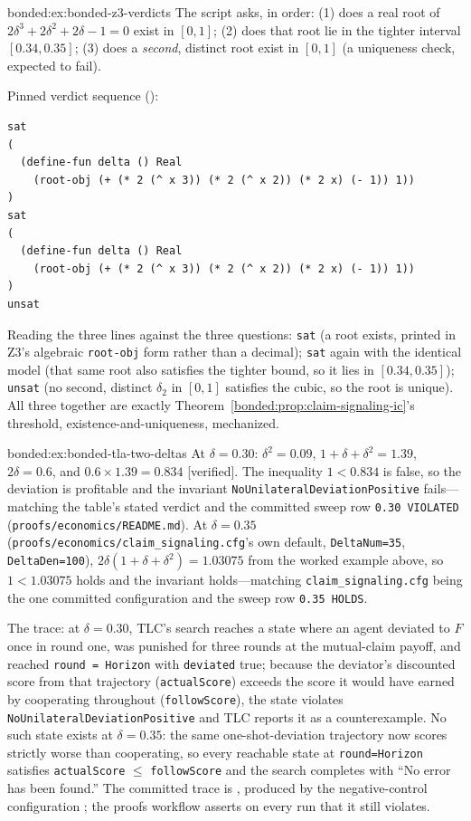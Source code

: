 \begin{pdSolution}{bonded:ex:bonded-z3-verdicts}
The script asks, in order: (1) does a real root of $2\delta^3+2\delta^2+2\delta-1=0$ exist in $[0,1]$; (2) does that root lie in the tighter interval $[0.34, 0.35]$; (3) does a \emph{second}, distinct root exist in $[0,1]$ (a uniqueness check, expected to fail).

Pinned verdict sequence ():
\begin{lstlisting}
sat
(
  (define-fun delta () Real
    (root-obj (+ (* 2 (^ x 3)) (* 2 (^ x 2)) (* 2 x) (- 1)) 1))
)
sat
(
  (define-fun delta () Real
    (root-obj (+ (* 2 (^ x 3)) (* 2 (^ x 2)) (* 2 x) (- 1)) 1))
)
unsat
\end{lstlisting}
Reading the three lines against the three questions: \texttt{sat} (a root exists, printed in Z3's algebraic \texttt{root-obj} form rather than a decimal); \texttt{sat} again with the identical model (that same root also satisfies the tighter bound, so it lies in $[0.34,0.35]$); \texttt{unsat} (no second, distinct $\delta_2$ in $[0,1]$ satisfies the cubic, so the root is unique). All three together are exactly Theorem~\ref{bonded:prop:claim-signaling-ic}'s threshold, existence-and-uniqueness, mechanized.
\end{pdSolution}
\begin{pdSolution}{bonded:ex:bonded-tla-two-deltas}
At $\delta=0.30$: $\delta^2=0.09$, $1+\delta+\delta^2=1.39$, $2\delta=0.6$, and $0.6\times1.39=0.834$ [verified]. The inequality $1<0.834$ is false, so the deviation is profitable and the invariant \texttt{NoUnilateralDeviationPositive} fails---matching the table's stated verdict and the committed sweep row \texttt{0.30 VIOLATED} (\texttt{proofs/economics/README.md}). At $\delta=0.35$ (\texttt{proofs/economics/claim\_signaling.cfg}'s own default, \texttt{DeltaNum=35}, \texttt{DeltaDen=100}), $2\delta(1+\delta+\delta^2)=1.03075$ from the worked example above, so $1<1.03075$ holds and the invariant holds---matching \texttt{claim\_signaling.cfg} being the one committed configuration and the sweep row \texttt{0.35 HOLDS}.

The trace: at $\delta=0.30$, TLC's search reaches a state where an agent deviated to $F$ once in round one, was punished for three rounds at the mutual-claim payoff, and reached \texttt{round = Horizon} with \texttt{deviated} true; because the deviator's discounted score from that trajectory (\texttt{actualScore}) exceeds the score it would have earned by cooperating throughout (\texttt{followScore}), the state violates \texttt{No}\allowbreak\texttt{Unilateral}\allowbreak\texttt{Deviation}\allowbreak\texttt{Positive} and TLC reports it as a counterexample. No such state exists at $\delta=0.35$: the same one-shot-deviation trajectory now scores strictly worse than cooperating, so every reachable state at \texttt{round=Horizon} satisfies \texttt{actualScore} $\le$ \texttt{followScore} and the search completes with ``No error has been found.'' The committed trace is , produced by the negative-control configuration ; the proofs workflow asserts on every run that it still violates.
\end{pdSolution}
